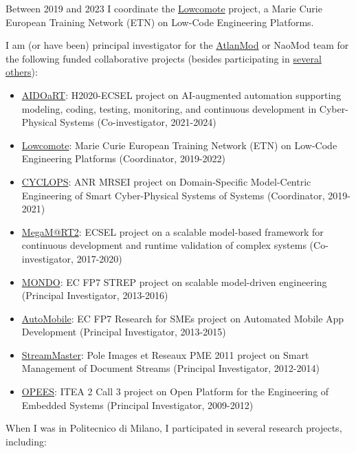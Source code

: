 Between 2019 and 2023 I coordinate the
\href{https://www.lowcomote.eu/}{Lowcomote} project, a Marie Curie
European Training Network (ETN) on Low-Code Engineering Platforms.

I am (or have been) principal investigator for the
\href{http://web.emn.fr/x-info/atlanmod/index.php?title=Main_Page}{AtlanMod}
or NaoMod team for the following funded collaborative projects (besides
participating in
\href{http://web.emn.fr/x-info/atlanmod/index.php?title=Projects}{several
others}):

\begin{itemize}
\tightlist
\item
  \href{https://www.aidoart.eu/}{AIDOaRT}: H2020-ECSEL project on
  AI-augmented automation supporting modeling, coding, testing,
  monitoring, and continuous development in Cyber-Physical Systems
  (Co-investigator, 2021-2024)
\item
  \href{https://www.lowcomote.eu/}{Lowcomote}: Marie Curie European
  Training Network (ETN) on Low-Code Engineering Platforms (Coordinator,
  2019-2022)
\item
  \href{http://massimotisi.github.io}{CYCLOPS}: ANR MRSEI project on
  Domain-Specific Model-Centric Engineering of Smart Cyber-Physical
  Systems of Systems (Coordinator, 2019-2021)
\item
  \href{https://megamart2-ecsel.eu/}{MegaM@RT2}: ECSEL project on a
  scalable model-based framework for continuous development and runtime
  validation of complex systems (Co-investigator, 2017-2020)
\item
  \href{http://www.mondo-project.org/}{MONDO}: EC FP7 STREP project on
  scalable model-driven engineering (Principal Investigator, 2013-2016)
\item
  \href{http://automobile.webratio.com/}{AutoMobile}: EC FP7 Research
  for SMEs project on Automated Mobile App Development (Principal
  Investigator, 2013-2015)
\item
  \href{http://www.irccyn.ec-nantes.fr/fr/projets-ivc/projet-streammaster-ivc}{StreamMaster}:
  Pole Images et Reseaux PME 2011 project on Smart Management of
  Document Streams (Principal Investigator, 2012-2014)
\item
  \href{https://itea3.org/project/opees.html}{OPEES}: ITEA 2 Call 3
  project on Open Platform for the Engineering of Embedded Systems
  (Principal Investigator, 2009-2012)
\end{itemize}

When I was in Politecnico di Milano, I participated in several research
projects, including:

